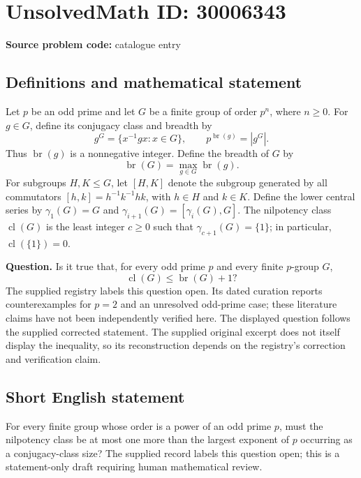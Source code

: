 \documentclass[11pt]{article}
\begin{document}
\section*{UnsolvedMath ID: 30006343}
\textbf{Source problem code:} catalogue entry
\subsection{Definitions and mathematical statement}
Let \(p\) be an odd prime and let \(G\) be a finite group of order \(p^n\), where \(n\geq 0\). For \(g\in G\), define its conjugacy class and breadth by
\[
 g^G=\{x^{-1}gx:x\in G\},\qquad
 p^{\operatorname{br}(g)}=|g^G|.
\]
Thus \(\operatorname{br}(g)\) is a nonnegative integer. Define the breadth of \(G\) by
\[
 \operatorname{br}(G)=\max_{g\in G}\operatorname{br}(g).
\]
For subgroups \(H,K\leq G\), let \([H,K]\) denote the subgroup generated by all commutators \([h,k]=h^{-1}k^{-1}hk\), with \(h\in H\) and \(k\in K\). Define the lower central series by \(\gamma_1(G)=G\) and \(\gamma_{i+1}(G)=[\gamma_i(G),G]\). The nilpotency class \(\operatorname{cl}(G)\) is the least integer \(c\geq 0\) such that \(\gamma_{c+1}(G)=\{1\}\); in particular, \(\operatorname{cl}(\{1\})=0\).

\textbf{Question.} Is it true that, for every odd prime \(p\) and every finite \(p\)-group \(G\),
\[
 \operatorname{cl}(G)\leq\operatorname{br}(G)+1?
\]
The supplied registry labels this question open. Its dated curation reports counterexamples for \(p=2\) and an unresolved odd-prime case; these literature claims have not been independently verified here. The displayed question follows the supplied corrected statement. The supplied original excerpt does not itself display the inequality, so its reconstruction depends on the registry's correction and verification claim.
\subsection{Short English statement}
For every finite group whose order is a power of an odd prime \(p\), must the nilpotency class be at most one more than the largest exponent of \(p\) occurring as a conjugacy-class size? The supplied record labels this question open; this is a statement-only draft requiring human mathematical review.
\end{document}
